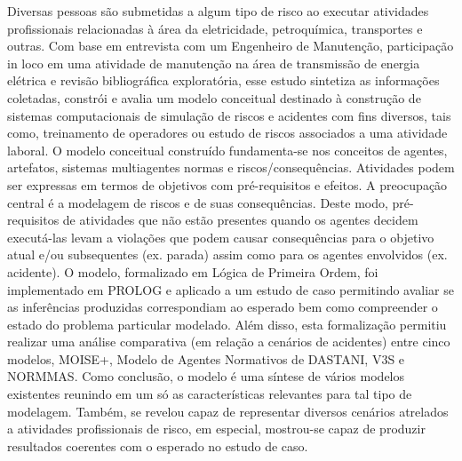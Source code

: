 Diversas pessoas são submetidas a algum tipo de risco ao executar atividades profissionais relacionadas à área da eletricidade, petroquímica, transportes e outras. Com base em entrevista com um Engenheiro de Manutenção, participação in loco em uma atividade de manutenção na área de transmissão de energia elétrica e revisão bibliográfica exploratória, esse estudo sintetiza as informações coletadas, constrói e avalia um modelo conceitual destinado à construção de sistemas computacionais de simulação de riscos e acidentes com fins diversos, tais como, treinamento de operadores ou estudo de riscos associados a uma atividade laboral. O modelo conceitual construído fundamenta-se nos conceitos de agentes, artefatos, sistemas multiagentes normas e riscos/consequências. Atividades podem ser expressas em termos de objetivos com pré-requisitos e efeitos. A preocupação central é a modelagem de riscos e de suas consequências. Deste modo, pré-requisitos de atividades que não estão presentes quando os agentes decidem executá-las levam a violações que podem causar consequências para o objetivo atual e/ou subsequentes (ex. parada) assim como para os agentes envolvidos (ex. acidente). O modelo, formalizado em Lógica de Primeira Ordem, foi implementado em PROLOG e aplicado a um estudo de caso permitindo avaliar se as inferências produzidas correspondiam ao esperado bem como compreender o estado do problema particular modelado. Além disso, esta formalização permitiu realizar uma análise comparativa (em relação a cenários de acidentes) entre cinco modelos, MOISE+, Modelo de Agentes Normativos de DASTANI, V3S e NORMMAS. Como conclusão, o modelo é uma síntese de vários modelos existentes reunindo em um só as características relevantes para tal tipo de modelagem. Também, se revelou capaz de representar diversos cenários atrelados a atividades profissionais de risco, em especial, mostrou-se capaz de produzir resultados coerentes com o esperado no estudo de caso.